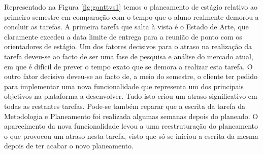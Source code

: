Representado na Figura \ref{fig:ganttvs1} temos o planeamento de estágio relativo ao primeiro semestre em comparação com o tempo que o aluno realmente demorou a concluir as tarefas. A primeira tarefa que salta à vista é o Estado de Arte, que claramente excedeu a data limite de entrega para a reunião de ponto com os orientadores de estágio. Um dos fatores decisivos para o atraso na realização da tarefa deveu-se ao facto de ser uma fase de pesquisa e análise do mercado atual, em que é difícil de prever o tempo exato que se demora a realizar esta tarefa. O outro fator decisivo deveu-se ao facto de, a meio do semestre, o cliente ter pedido para implementar uma nova funcionalidade que representa um dos principais objetivos na plataforma a desenvolver. Tudo isto criou um atraso significativo em todas as restantes tarefas. Pode-se também reparar que a escrita da tarefa da Metodologia e Planeamento foi realizada algumas semanas depois do planeado. O aparecimento da nova funcionalidade levou a uma reestruturação do planeamento o que provocou um atraso nesta tarefa, visto que só se iniciou a escrita da mesma depois de ter acabar o novo planeamento.



\glsresetall




